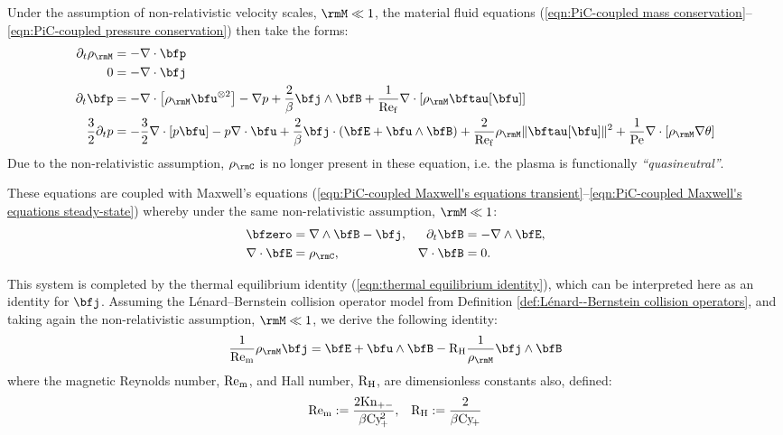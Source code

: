     Under the assumption of non-relativistic velocity scales, $\rmM  \ll  1$, the material fluid equations (\ref{eqn:PiC-coupled mass conservation}--\ref{eqn:PiC-coupled pressure conservation}) then take the forms:
    \begin{align}
         \partial_{t}\rho_{\rmM}  &=  - \nabla\cdot\bfp  \\
                               0  &=  - \nabla\cdot\bfj  \\
                \partial_{t}\bfp  &=  - \nabla\cdot\left[\rho_{\rmM}\bfu^{\otimes 2}\right] - \nabla p + \frac{2}{\beta}\bfj\wedge\bfB + \frac{1}{\rmRef}\nabla\cdot[\rho_{\rmM}\bftau[\bfu]]  \\
        \frac{3}{2}\partial_{t}p  &=  - \frac{3}{2}\nabla\cdot[p\bfu] - p\nabla\cdot\bfu + \frac{2}{\beta}\bfj\cdot(\bfE + \bfu\wedge\bfB) + \frac{2}{\rmRef}\rho_{\rmM}\|\bftau[\bfu]\|^{2} + \frac{1}{\rmPe}\nabla\cdot[\rho_{\rmM}\nabla\theta]
    \end{align}
    Due to the non-relativistic assumption, $\rho_{\rmC}$ is no longer present in these equation, i.e. the plasma is functionally \emph{``quasineutral''}.

    These equations are coupled with Maxwell's equations (\ref{eqn:PiC-coupled Maxwell's equations transient}--\ref{eqn:PiC-coupled Maxwell's equations steady-state}) whereby under the same non-relativistic assumption, $\rmM  \ll  1$:
    \begin{align}
                 \bfzero  &=  \nabla\wedge\bfB - \bfj,  &
        \partial_{t}\bfB  &=  - \nabla\wedge\bfE,  \\
         \nabla\cdot\bfE  &=  \rho_{\rmC},  &
         \nabla\cdot\bfB  &=  0.
    \end{align}
    
    This system is completed by the thermal equilibrium identity (\ref{eqn:thermal equilibrium identity}), which can be interpreted here as an identity for $\bfj$. Assuming the Lénard--Bernstein collision operator model from Definition \ref{def:Lénard--Bernstein collision operators}, and taking again the non-relativistic assumption, $\rmM  \ll  1$, we derive the following identity:
    \begin{equation}
        \frac{1}{\rmRem}\rho_{\rmM}\bfj  =  \bfE + \bfu\wedge\bfB - \rmRH\frac{1}{\rho_{\rmM}}\bfj\wedge\bfB
    \end{equation}
    where the magnetic Reynolds number, $\mathrm{Re}_{\mathrm{m}}$, and Hall number, $\mathrm{R}_{\mathrm{H}}$, are dimensionless constants also, defined:
    \begin{align}
        \mathrm{Re}_{\mathrm{m}}  :=  \frac{2\mathrm{Kn}_{+-}}{\beta\mathrm{Cy}\!_{+}^{2}},  &&
        \mathrm{R}_{\mathrm{H}}   :=  \frac{2}{\beta\mathrm{Cy}\!_{+}}
    \end{align}

